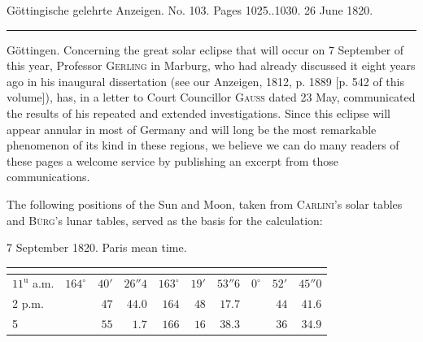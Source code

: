 \clearpage
{}
\hypertarget{native-627-lower}{}
\begin{center}\small Göttingische gelehrte Anzeigen. No. 103. Pages 1025..1030. 26 June 1820.\\[3pt]\rule{.72\linewidth}{.3pt}\end{center}

Göttingen. Concerning the great solar eclipse that will occur on 7 September of this year, Professor \textsc{Gerling} in Marburg, who had already discussed it eight years ago in his inaugural dissertation (see our Anzeigen, 1812, p. 1889 [p. 542 of this volume]), has, in a letter to Court Councillor \textsc{Gauss} dated 23 May, communicated the results of his repeated and extended investigations. Since this eclipse will appear annular in most of Germany and will long be the most remarkable phenomenon of its kind in these regions, we believe we can do many readers of these pages  a welcome service by publishing an excerpt from those communications.

The following positions of the Sun and Moon, taken from \textsc{Carlini}'s solar tables and \textsc{Bürg}'s lunar tables, served as the basis for the calculation:

7 September 1820. Paris mean time.

\begin{center}
\small\setlength{\tabcolsep}{2pt}\begin{tabular}{l|rrr|rrr|rrr}
 &  &  &  \\
\hline
$11^{\mathrm u}$ a.m. & $164^\circ$ & $40'$ & $26''4$ & $163^\circ$ & $19'$ & $53''6$ & $0^\circ$ & $52'$ & $45''0$ \\
2 p.m. & & $47$ & $44.0$ & $164$ & $48$ & $17.7$ & & $44$ & $41.6$ \\
5 & & $55$ & $1.7$ & $166$ & $16$ & $38.3$ & & $36$ & $34.9$ \\
\end{tabular}
\end{center}

